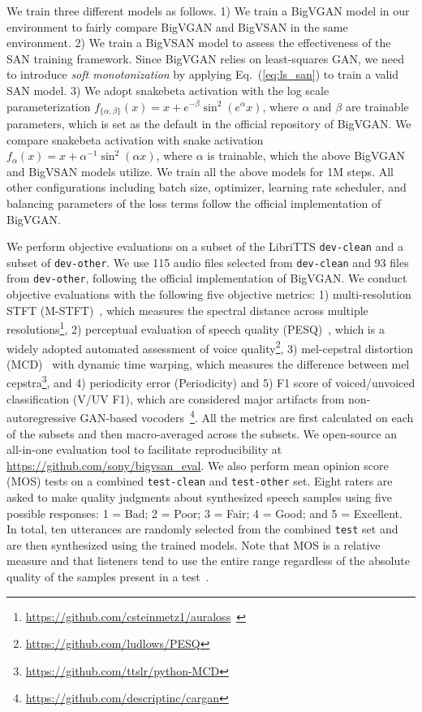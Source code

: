\documentclass{article}
\def\beqref#1{(\ref{#1})}
\begin{document}
We train three different models as follows. 1) We train a BigVGAN model in our environment to fairly compare BigVGAN and BigVSAN in the same environment. 2) We train a BigVSAN model to assess the effectiveness of the SAN training framework. Since BigVGAN relies on least-squares GAN, we need to introduce \textit{soft monotonization} by applying Eq.~\beqref{eq:ls_san} to train a valid SAN model. 3) We adopt snakebeta activation with the log scale parameterization $f_{\{\alpha,\beta\}}(x)=x+e^{-\beta}\sin^2(e^\alpha x)$, where $\alpha$ and $\beta$ are trainable parameters, which is set as the default in the official repository of BigVGAN. We compare snakebeta activation with snake activation~\cite{ziyin2020neural} $f_\alpha(x)=x+\alpha^{-1}\sin^2(\alpha x)$, where $\alpha$ is trainable, which the above BigVGAN and BigVSAN models utilize. We train all the above models for 1M steps. All other configurations including batch size, optimizer, learning rate scheduler, and balancing parameters of the loss terms follow the official implementation of BigVGAN.

We perform objective evaluations on a subset of the LibriTTS \texttt{dev-clean} and a subset of \texttt{dev-other}. We use 115 audio files selected from \texttt{dev-clean} and 93 files from \texttt{dev-other}, following the official implementation of BigVGAN. We conduct objective evaluations with the following five objective metrics: 1) multi-resolution STFT (M-STFT)~\cite{yamamoto2020parallel}, which measures the spectral distance across multiple resolutions\footnote{\url{https://github.com/csteinmetz1/auraloss}~\cite{steinmetz2020auraloss}}, 2) perceptual evaluation of speech quality (PESQ)~\cite{rix2001pesq}, which is a widely adopted automated assessment of voice quality\footnote{\url{https://github.com/ludlows/PESQ}}, 3) mel-cepstral distortion (MCD)~\cite{kubichek1993mel} with dynamic time warping, which measures the difference between mel cepstra\footnote{\url{https://github.com/ttslr/python-MCD}}, and 4) periodicity error (Periodicity) and 5) F1 score of voiced/unvoiced classification (V/UV F1), which are considered major artifacts from non-autoregressive GAN-based vocoders~\cite{morrison2022chunked}\footnote{\url{https://github.com/descriptinc/cargan}}. All the metrics are first calculated on each of the subsets and then macro-averaged across the subsets. We open-source an all-in-one evaluation tool to facilitate reproducibility at \url{https://github.com/sony/bigvsan_eval}. 
We also perform mean opinion score (MOS) tests on a combined \texttt{test-clean} and \texttt{test-other} set. Eight raters are asked to make quality judgments about synthesized speech samples using five possible responses: 1 = Bad; 2 = Poor; 3 = Fair; 4 = Good; and 5 = Excellent. In total, ten utterances are randomly selected from the combined \texttt{test} set and are then synthesized using the trained models. Note that MOS is a relative measure and that listeners tend to use the entire range regardless of the absolute quality of the samples present in a
test~\cite{cooper23investigating}.
\end{document}
